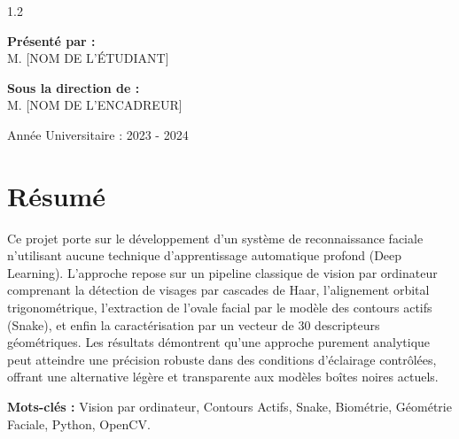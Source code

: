 \documentclass[11pt,a4paper,oneside]{report}
\begin{document}
\begin{titlepage}
\begin{spacing}{1.2}
        \begin{minipage}{0.45\textwidth}
            \begin{flushleft} \large
                \textbf{Présenté par :}\\
                M. [NOM DE L'ÉTUDIANT]
            \end{flushleft}
        \end{minipage}
        \hfill
        \begin{minipage}{0.45\textwidth}
            \begin{flushright} \large
                \textbf{Sous la direction de :}\\
                M. [NOM DE L'ENCADREUR]
            \end{flushright}
        \end{minipage}

        \vfill
        {\large Année Universitaire : 2023 - 2024}
    \end{spacing}
\end{titlepage}

\chapter*{Résumé}
\begin{tcolorbox}[keyresult, title={Résumé exécutif}]
Ce projet porte sur le développement d'un système de reconnaissance faciale n'utilisant aucune technique d'apprentissage automatique profond (Deep Learning). L'approche repose sur un pipeline classique de vision par ordinateur comprenant la détection de visages par cascades de Haar, l'alignement orbital trigonométrique, l'extraction de l'ovale facial par le modèle des contours actifs (Snake), et enfin la caractérisation par un vecteur de 30 descripteurs géométriques. Les résultats démontrent qu'une approche purement analytique peut atteindre une précision robuste dans des conditions d'éclairage contrôlées, offrant une alternative légère et transparente aux modèles boîtes noires actuels.
\end{tcolorbox}

\vspace{1cm}
\textbf{Mots-clés :} Vision par ordinateur, Contours Actifs, Snake, Biométrie, Géométrie Faciale, Python, OpenCV.

\tableofcontents
\listoffigures
\listoftables
\end{document}
